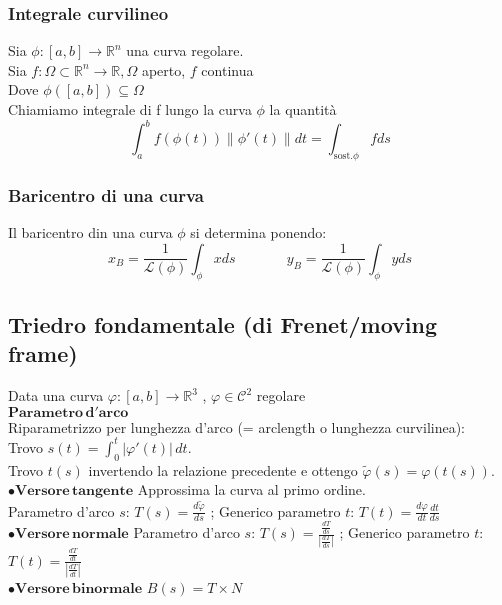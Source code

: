 \documentclass{article} %
\begin{document}
    \subsubsection*{Integrale curvilineo}
    Sia $\phi:[a,b]\to \mathbb{R}^n$ una curva regolare. \\
    Sia $f: \Omega \subset \mathbb{R}^n \to \mathbb{R}, \Omega$ aperto, $f$ continua \\
    Dove $\phi([a,b]) \subseteq \Omega$ \\
    Chiamiamo integrale di f lungo la curva $\phi$ la quantità \\
    $$\int_{a}^{b} f(\phi(t)) \lVert \phi'(t) \rVert dt = \int_{\text{sost.}\phi} f ds $$ 

    \subsubsection*{Baricentro di una curva}
    Il baricentro din una curva $\phi$ si determina ponendo:
    $$x_B= \frac{1}{\mathcal{L}(\phi)} \int_{\phi} x ds \,\,\,\,\,\,\,\,\,\,\,\,\,\,\,\,\,\,\,\,\,\, y_B= \frac{1}{\mathcal{L}(\phi)} \int_{\phi} y ds$$

    \subsection{Triedro fondamentale (di Frenet/moving frame)}
    Data una curva $\varphi:[a,b] \to \mathbb{R} ^3$ , $\varphi \in \mathcal{C} ^2 $ regolare \\
    $\mathbf{Parametro \, d'arco}$ \\
    Riparametrizzo per lunghezza d'arco (= arclength o lunghezza curvilinea): \\ Trovo $s(t) = \int_{0}^{t} \left| \varphi'(t) \right| \,dt $. \\ Trovo $t(s)$ invertendo la relazione precedente e ottengo $\tilde{\varphi}(s) = \varphi( t(s) )$. \\
    $\mathbf{\bullet Versore \, tangente}$
    Approssima la curva al primo ordine. \\
    Parametro d'arco $s$: $T(s)=\frac{d\tilde{\varphi}}{ds} $ ; 
    Generico parametro $t$: $T(t) = \frac{d\varphi}{dt} \frac{dt}{ds}$ \\
   $\mathbf{\bullet Versore \, normale}$
   Parametro d'arco $s$: $T(s)=\frac{ \frac{dT}{ds}}{ \left| \frac{dT}{ds} \right|}$ ; 
   Generico parametro $t$: $T(t)=\frac{ \frac{dT}{dt}}{ \left| \frac{dT}{dt} \right|}$ \\
   $ \mathbf{\bullet Versore \, binormale}$
    $ B(s) = T \times N $
\end{document}
